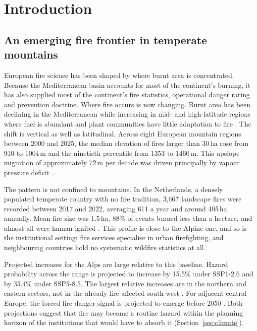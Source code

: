 \documentclass[11pt,a4paper]{article}
\begin{document}
\section{Introduction}
\label{sec:intro}

\subsection{An emerging fire frontier in temperate mountains}

European fire science has been shaped by where burnt area is concentrated. Because the Mediterranean basin accounts for most of the continent's burning, it has also supplied most of the continent's fire statistics, operational danger rating and prevention doctrine. Where fire occurs is now changing. Burnt area has been declining in the Mediterranean while increasing in mid- and high-latitude regions where fuel is abundant and plant communities have little adaptation to fire \citep{miller_compounding_2025}. The shift is vertical as well as latitudinal. Across eight European mountain regions between 2000 and 2025, the median elevation of fires larger than 30\,ha rose from 910 to 1004\,m and the ninetieth percentile from 1353 to 1460\,m. This upslope migration of approximately 72\,m per decade was driven principally by vapour pressure deficit \citep{beloiu_climatedriven_2026}.

The pattern is not confined to mountains. In the Netherlands, a densely populated temperate country with no fire tradition, 3{,}667 landscape fires were recorded between 2017 and 2022, averaging 611 a year and around 405\,ha annually. Mean fire size was 1.5\,ha, 88\% of events burned less than a hectare, and almost all were human-ignited \citep{stoof_temperate_2024}. This profile is close to the Alpine one, and so is the institutional setting: fire services specialise in urban firefighting, and neighbouring countries hold no systematic wildfire statistics at all.

Projected increases for the Alps are large relative to this baseline. Hazard probability across the range is projected to increase by 15.5\% under SSP1-2.6 and by 35.4\% under SSP5-8.5. The largest relative increases are in the northern and eastern sectors, not in the already fire-affected south-west \citep{gerberding_mapping_2025}. For adjacent central Europe, the forced fire-danger signal is projected to emerge before 2050 \citep{miller_climate_2024}. Both projections suggest that fire may become a routine hazard within the planning horizon of the institutions that would have to absorb it (Section~\ref{sec:climate}).
\end{document}
